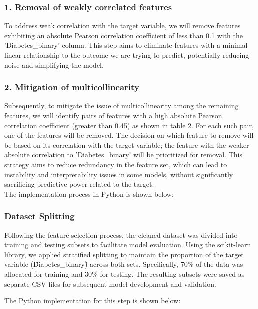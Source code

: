 \subsubsection*{1. Removal of weakly correlated features}
To address weak correlation with the target variable, we will remove features exhibiting an absolute Pearson correlation coefficient of less than 0.1 with the 'Diabetes\_binary' column. This step aims to eliminate features with a minimal linear relationship to the outcome we are trying to predict, potentially reducing noise and simplifying the model.


\subsubsection*{2. Mitigation of multicollinearity}
Subsequently, to mitigate the issue of multicollinearity among the remaining features, we will identify pairs of features with a high absolute Pearson correlation coefficient (greater than 0.45) as shown in table 2. For each such pair, one of the features will be removed. The decision on which feature to remove will be based on its correlation with the target variable; the feature with the weaker absolute correlation to 'Diabetes\_binary' will be prioritized for removal. This strategy aims to reduce redundancy in the feature set, which can lead to instability and interpretability issues in some models, without significantly sacrificing predictive power related to the target.
\\
\newline
The implementation process in Python is shown below:
\\




\subsubsection{Dataset Splitting}

Following the feature selection process, the cleaned dataset was divided into training and testing subsets to facilitate model evaluation. Using the scikit-learn library, we applied stratified splitting to maintain the proportion of the target variable (\"Diabetes\_binary\") across both sets. Specifically, 70$\%$ of the data was allocated for training and 30$\%$ for testing. The resulting subsets were saved as separate CSV files for subsequent model development and validation.


The Python implementation for this step is shown below:







